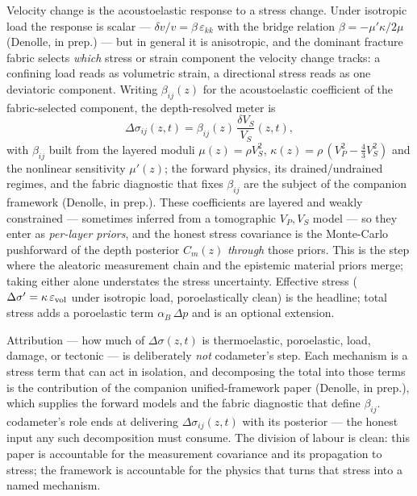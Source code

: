\documentclass[
  11pt,
  letterpaper,
]{article}
\begin{document}
Velocity change is the acoustoelastic response to a stress change. Under
isotropic load the response is scalar ---
\(\delta v/v = \beta\,\varepsilon_{kk}\) with the bridge relation
\(\beta=-\mu'\kappa/2\mu\) (Denolle, in prep.) --- but in general it is
anisotropic, and the dominant fracture fabric selects \emph{which}
stress or strain component the velocity change tracks: a confining load
reads as volumetric strain, a directional stress reads as one deviatoric
component. Writing \(\beta_{ij}(z)\) for the acoustoelastic coefficient
of the fabric-selected component, the depth-resolved meter is
\begin{equation}
\Delta\sigma_{ij}(z,t) = \beta_{ij}(z)\,\frac{\delta V_S}{V_S}(z,t),
\label{eq:acoustoelastic}
\end{equation} with \(\beta_{ij}\) built from the layered moduli
\(\mu(z)=\rho V_S^2\), \(\kappa(z)=\rho\,(V_P^2-\tfrac43 V_S^2)\) and
the nonlinear sensitivity \(\mu'(z)\); the forward physics, its
drained/undrained regimes, and the fabric diagnostic that fixes
\(\beta_{ij}\) are the subject of the companion framework (Denolle, in
prep.). These coefficients are layered and weakly constrained ---
sometimes inferred from a tomographic \(V_P,V_S\) model --- so they
enter as \emph{per-layer priors}, and the honest stress covariance is
the Monte-Carlo pushforward of the depth posterior \(C_m(z)\)
\emph{through} those priors. This is the step where the aleatoric
measurement chain and the epistemic material priors merge; taking either
alone understates the stress uncertainty. Effective stress
(\(\Delta\sigma'=\kappa\,\varepsilon_{\rm vol}\) under isotropic load,
poroelastically clean) is the headline; total stress adds a poroelastic
term \(\alpha_B\,\Delta p\) and is an optional extension.

Attribution --- how much of \(\Delta\sigma(z,t)\) is thermoelastic,
poroelastic, load, damage, or tectonic --- is deliberately \emph{not}
codameter's step. Each mechanism is a stress term that can act in
isolation, and decomposing the total into those terms is the
contribution of the companion unified-framework paper (Denolle, in
prep.), which supplies the forward models and the fabric diagnostic that
define \(\beta_{ij}\). codameter's role ends at delivering
\(\Delta\sigma_{ij}(z,t)\) with its posterior --- the honest input any
such decomposition must consume. The division of labour is clean: this
paper is accountable for the measurement covariance and its propagation
to stress; the framework is accountable for the physics that turns that
stress into a named mechanism.
\end{document}
